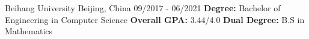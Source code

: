

\begin{cventries}

  \cventry
    {} %
    {Beihang University} %
    {Beijing, China} %
    {09/2017 - 06/2021} %
    {
      \textbf{Degree:} Bachelor of Engineering in Computer Science
      \newline
      \textbf{Overall GPA:} 3.44/4.0
      \newline
      \textbf{Dual Degree:} B.S in Mathematics
    }

\end{cventries}

